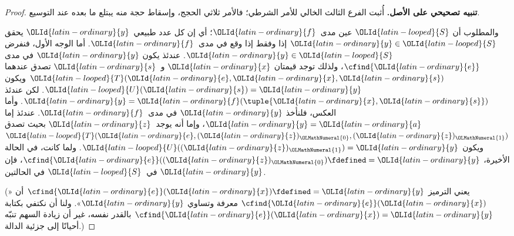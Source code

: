\documentclass[../../../include/open-logic-section]{subfiles}
\begin{document}
\begin{proof}
\textbf{تنبيه تصحيحي على الأصل.} أُثبت الفرع الثالث الخالي للأمر
الشرطي؛ فالأمر ثلاثي الحجج، وإسقاط حجة منه يبتلع ما بعده عند
التوسيع.

والمطلوب أن ${\OLId{latin-looped}{S}}$ عين مدى~${\OLId{latin-ordinary}{f}}$؛ أي إن كل عدد طبيعي~${\OLId{latin-ordinary}{y}}$ يحقق ${\OLId{latin-ordinary}{y}}\in {\OLId{latin-looped}{S}}$
إذا وفقط إذا وقع في مدى~${\OLId{latin-ordinary}{f}}$. أما الوجه الأول، فنفرض ${\OLId{latin-ordinary}{y}}\in {\OLId{latin-looped}{S}}$.
عندئذ يكون ${\OLId{latin-ordinary}{y}}$ في مدى $\cfind{{\OLId{latin-ordinary}{e}}}$، ولذلك توجد قيمتان ${\OLId{latin-ordinary}{x}}$ و~${\OLId{latin-ordinary}{s}}$ تصدق
عندهما ${\OLId{latin-looped}{T}}({\OLId{latin-ordinary}{e}},{\OLId{latin-ordinary}{x}},{\OLId{latin-ordinary}{s}})$ ويكون ${\OLId{latin-looped}{U}}({\OLId{latin-ordinary}{s}})={\OLId{latin-ordinary}{y}}$. لكن عندئذ
${\OLId{latin-ordinary}{y}}={\OLId{latin-ordinary}{f}}(\tuple{{\OLId{latin-ordinary}{x}},{\OLId{latin-ordinary}{s}}})$. وأما العكس، فلنأخذ ${\OLId{latin-ordinary}{y}}$ في مدى~${\OLId{latin-ordinary}{f}}$. عندئذ إما
${\OLId{latin-ordinary}{y}}={\OLId{latin-ordinary}{a}}$، وإما أنه يوجد~${\OLId{latin-ordinary}{z}}$ بحيث تصدق ${\OLId{latin-looped}{T}}({\OLId{latin-ordinary}{e}},({\OLId{latin-ordinary}{z}})_{\OLMathNumeral{0}},({\OLId{latin-ordinary}{z}})_{\OLMathNumeral{1}})$ ويكون
${\OLId{latin-looped}{U}}(({\OLId{latin-ordinary}{z}})_{\OLMathNumeral{1}})={\OLId{latin-ordinary}{y}}$. ولما كانت، في الحالة الأخيرة،
$\cfind{{\OLId{latin-ordinary}{e}}}(({\OLId{latin-ordinary}{z}})_{\OLMathNumeral{0}})\fdefined={\OLId{latin-ordinary}{y}}$، فإن ${\OLId{latin-ordinary}{y}}$ في~${\OLId{latin-looped}{S}}$ في الحالتين.

(يعني الترميز $\cfind{{\OLId{latin-ordinary}{e}}}({\OLId{latin-ordinary}{x}})\fdefined={\OLId{latin-ordinary}{y}}$ أن «$\cfind{{\OLId{latin-ordinary}{e}}}({\OLId{latin-ordinary}{x}})$ معرفة
وتساوي ${\OLId{latin-ordinary}{y}}$». ولنا أن نكتفي بكتابة $\cfind{{\OLId{latin-ordinary}{e}}}({\OLId{latin-ordinary}{x}})={\OLId{latin-ordinary}{y}}$ بالقدر نفسه، غير أن
زيادة السهم تنبّه أحيانًا إلى جزئية الدالة.)


\end{proof}
\end{document}
